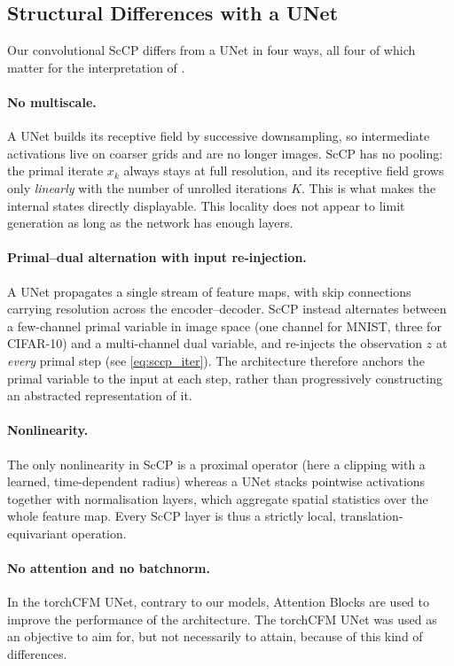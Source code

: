 \documentclass[a4paper,11pt]{article}
\theoremstyle{plain}{\theorembodyfont{\rmfamily}%
\newtheorem{proposition}[theorem]{Proposition}}
\theoremstyle{plain}{\theorembodyfont{\rmfamily}%
\newtheorem{notation}[theorem]{Notation}}
\theoremstyle{plain}{\theorembodyfont{\rmfamily}%
\newtheorem{assumption}[theorem]{Assumption}}
\theoremstyle{plain}{\theorembodyfont{\rmfamily}%
\newtheorem{problem}[theorem]{Problem}}
\theoremstyle{plain}{\theorembodyfont{\rmfamily}%
\newtheorem{example}[theorem]{Example}}
\theoremstyle{plain}{\theorembodyfont{\rmfamily}%
\newtheorem{remark}[theorem]{Remark}}
\theoremstyle{plain}{\theorembodyfont{\rmfamily}%
\newtheorem{definition}[theorem]{Definition}}
\theoremstyle{plain}{\theorembodyfont{\rmfamily}%
\newtheorem{question}[theorem]{Question}}
\numberwithin{equation}{section}
\begin{document}
\subsection{Structural Differences with a UNet}
\label{subsubsec:vs_unet}

Our convolutional ScCP differs from a UNet in four ways, all four of which matter
for the interpretation of .

\paragraph{No multiscale.} A UNet builds its receptive field by successive
downsampling, so intermediate activations live on coarser grids and are no longer
images. ScCP has no pooling: the primal iterate $x_k$ always stays at full
resolution, and its receptive field grows only \emph{linearly} with the number of
unrolled iterations $K$. This is what makes the internal states directly
displayable. This locality does not appear to limit generation as long as
the network has enough layers.

\paragraph{Primal--dual alternation with input re-injection.} A UNet propagates a
single stream of feature maps, with skip connections carrying resolution across the
encoder--decoder. ScCP instead alternates between a few-channel primal variable in
image space (one channel for MNIST, three for CIFAR-10) and a multi-channel dual
variable, and re-injects the observation $z$ at \emph{every} primal step (see
\eqref{eq:sccp_iter}). The architecture therefore anchors the primal variable to the
input at each step, rather than progressively constructing an abstracted
representation of it.

\paragraph{Nonlinearity.} The only nonlinearity in ScCP is a proximal operator (here a clipping with a learned, time-dependent radius) whereas a UNet stacks
pointwise activations together with normalisation layers, which aggregate spatial
statistics over the whole feature map. Every ScCP layer is thus a strictly local,
translation-equivariant operation.

\paragraph{No attention and no batchnorm.} In the torchCFM UNet, contrary to our models, Attention Blocks are used to improve the performance of the architecture. The torchCFM UNet was used as an objective to aim for, but not necessarily to attain, because of this kind of differences.
\end{document}
